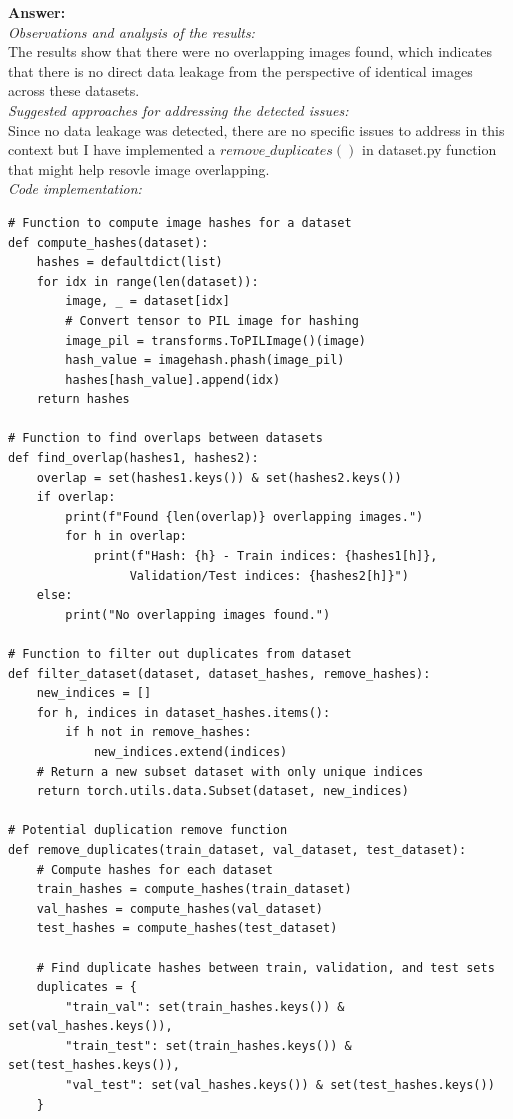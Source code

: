 \documentclass[11pt, oneside]{article}   	%
\begin{document}
\textbf{Answer:} 
\\
\textit{Observations and analysis of the results: }
\\
The results show that there were no overlapping images found, which indicates that there is no direct data leakage from the perspective of identical images across these datasets.
\\
\textit{Suggested approaches for addressing the detected issues: }
\\
Since no data leakage was detected, there are no specific issues to address in this context but I have implemented a $remove\_duplicates()$ in dataset.py function that might help resovle image overlapping.
\\
\textit{Code implementation: }
\begin{verbatim}
# Function to compute image hashes for a dataset
def compute_hashes(dataset):
    hashes = defaultdict(list)
    for idx in range(len(dataset)):
        image, _ = dataset[idx]
        # Convert tensor to PIL image for hashing
        image_pil = transforms.ToPILImage()(image)
        hash_value = imagehash.phash(image_pil)
        hashes[hash_value].append(idx)
    return hashes

# Function to find overlaps between datasets
def find_overlap(hashes1, hashes2):
    overlap = set(hashes1.keys()) & set(hashes2.keys())
    if overlap:
        print(f"Found {len(overlap)} overlapping images.")
        for h in overlap:
            print(f"Hash: {h} - Train indices: {hashes1[h]},
                 Validation/Test indices: {hashes2[h]}")
    else:
        print("No overlapping images found.")

# Function to filter out duplicates from dataset
def filter_dataset(dataset, dataset_hashes, remove_hashes):
    new_indices = []
    for h, indices in dataset_hashes.items():
        if h not in remove_hashes:
            new_indices.extend(indices)
    # Return a new subset dataset with only unique indices
    return torch.utils.data.Subset(dataset, new_indices)

# Potential duplication remove function
def remove_duplicates(train_dataset, val_dataset, test_dataset):
    # Compute hashes for each dataset
    train_hashes = compute_hashes(train_dataset)
    val_hashes = compute_hashes(val_dataset)
    test_hashes = compute_hashes(test_dataset)

    # Find duplicate hashes between train, validation, and test sets
    duplicates = {
        "train_val": set(train_hashes.keys()) & set(val_hashes.keys()),
        "train_test": set(train_hashes.keys()) & set(test_hashes.keys()),
        "val_test": set(val_hashes.keys()) & set(test_hashes.keys())
    }


\end{verbatim}
\end{document}
